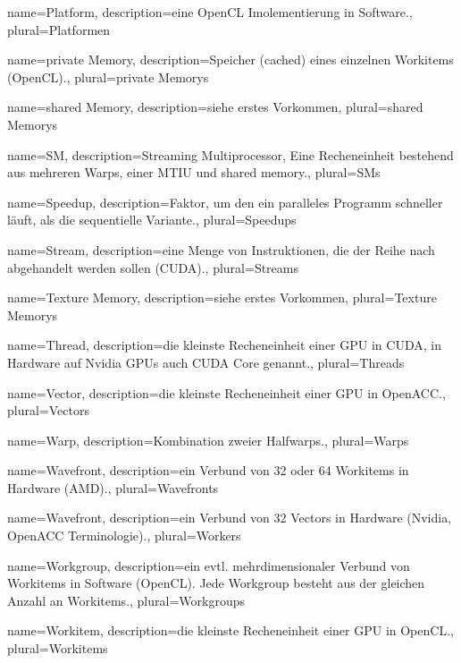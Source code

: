 {
	name=Platform,
	description={eine OpenCL Imolementierung in Software.},
	plural=Platformen
}

{
	name=private Memory,
	description={Speicher (cached) eines einzelnen Workitems (OpenCL).},
	plural=private Memorys
}

{
	name=shared Memory,
	description={siehe erstes Vorkommen},
	plural=shared Memorys
}

{
	name=SM,
	description={Streaming Multiprocessor, Eine Recheneinheit bestehend aus mehreren Warps, einer MTIU und shared memory.},
	plural=SMs
}

{
	name=Speedup,
	description={Faktor, um den ein paralleles Programm schneller läuft, als die sequentielle Variante.},
	plural=Speedups
}

{
	name=Stream,
	description={eine Menge von Instruktionen, die der Reihe nach abgehandelt werden sollen (CUDA).},
	plural=Streams
}

{
	name=Texture Memory,
	description={siehe erstes Vorkommen},
	plural=Texture Memorys
}

{
	name=Thread,
	description={die kleinste Recheneinheit einer GPU in CUDA, in Hardware auf Nvidia GPUs auch CUDA Core genannt.},
	plural=Threads
}

{
	name=Vector,
	description={die kleinste Recheneinheit einer GPU in OpenACC.},
	plural=Vectors
}

{
	name=Warp,
	description={Kombination zweier Halfwarps.},
	plural=Warps
}

{
	name=Wavefront,
	description={ein Verbund von 32 oder 64 Workitems in Hardware (AMD).},
	plural=Wavefronts
}

{
	name=Wavefront,
	description={ein Verbund von 32 Vectors in Hardware (Nvidia, OpenACC Terminologie).},
	plural=Workers
}

{
	name=Workgroup,
	description={ein evtl. mehrdimensionaler Verbund von Workitems in Software (OpenCL). Jede Workgroup besteht aus der gleichen Anzahl an Workitems.},
	plural=Workgroups
}

{
	name=Workitem,
	description={die kleinste Recheneinheit einer GPU in OpenCL.},
	plural=Workitems
}
